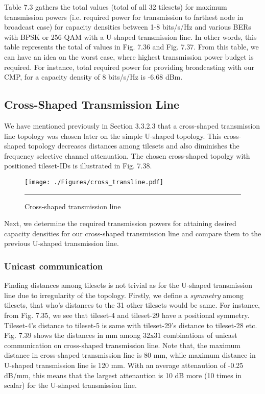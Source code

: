 Table 7.3 gathers the total values (total of all 32 tilesets) for maximum transmission powers (i.e. required power for transmission to farthest node in broadcast case) for capacity densities between 1-8 bits/s/Hz and various BERs with BPSK or 256-QAM with a U-shaped transmission line. In other words, this table represents the total of values in Fig. 7.36 and Fig. 7.37. From this table, we can have an idea on the worst case, where highest transmission power budget is required.  For instance, total required power for providing broadcasting with our CMP, for a capacity density of 8 bits/s/Hz is -6.68 dBm.

\subsection{Cross-Shaped Transmission Line}

We have mentioned previously in Section 3.3.2.3 that a cross-shaped transmission line topology was chosen later on the simple U-shaped topology. This cross-shaped topology decreases distances among tilesets and also diminishes the frequency selective channel attenuation. The chosen cross-shaped topolgy with positioned tileset-IDs is illustrated in Fig. 7.38. 

 
\begin{figure}[H]
  \centering
    \texttt{[image: ./Figures/cross\_transline.pdf]}
    \rule{35em}{0.5pt}
  \caption[Cross-shaped transmission line]{Cross-shaped transmission line}
  \label{fig:Electron}
\end{figure}

Next, we determine the required transmission powers for attaining desired capacity densities for our cross-shaped transmission line and compare them to the previous U-shaped transmission line. 

\subsubsection{Unicast communication}

Finding distances among tilesets is not trivial as for the U-shaped transmission line due to irregularity of the topology. Firstly, we define a \textit{symmetry} among tilesets, that who's distances to the 31 other tilesets would be same. For instance, from Fig. 7.35, we see that tileset-4 and tileset-29 have a positional symmetry. Tileset-4's distance to tileset-5 is same with tileset-29's distance to tileset-28 etc. Fig. 7.39 shows the distances in mm among 32x31 combinations of unicast communication on cross-shaped transmission line. Note that, the maximum distance in cross-shaped transmission line is 80 mm, while maximum distance in U-shaped transmission line is 120 mm. With an average attenaution of -0.25 dB/mm, this means that the largest attenaution is 10 dB more (10 times in scalar) for the U-shaped transmission line. 

